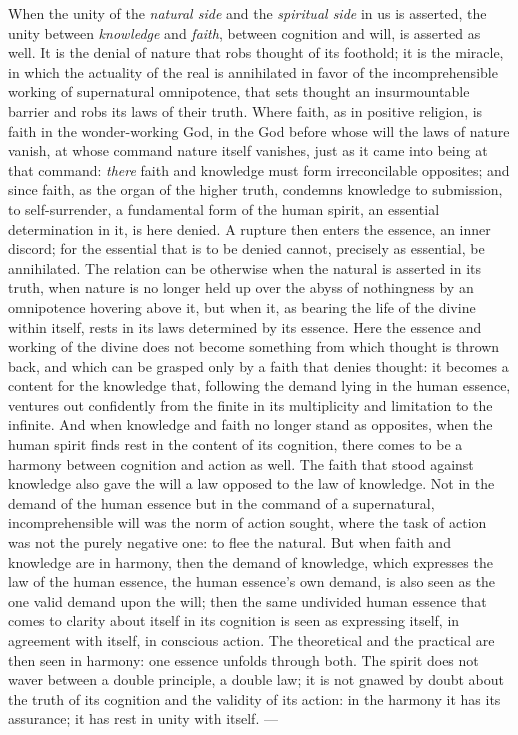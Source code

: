 \documentclass[12pt,a4paper,openany]{book}
\newcommand{\opage}[1]{\marginnote{\footnotesize\textit{[#1]}}}
\begin{document}
When the unity of the \emph{natural side} and the \emph{spiritual side}
in us is asserted, the unity between \emph{knowledge} and \emph{faith},
between cognition and will, is asserted as well. It is the denial
of nature that robs thought of its foothold; it is the miracle, in
which the actuality of the real is annihilated in favor of the
incomprehensible working of supernatural omnipotence, that sets
thought an insurmountable barrier and robs its laws of their truth.
Where faith, as in positive religion, is faith in the wonder-working
God, in the God before whose will the laws of nature vanish, at
whose command nature itself vanishes, just as it came into being at
that command: \emph{there} faith and knowledge must form irreconcilable
opposites; and since faith, as the organ of the higher truth,
condemns knowledge to submission, to self-surrender, a fundamental
form of the human spirit, an essential determination in it, is here
denied. A rupture then enters the essence, an inner discord; for the
essential that is to be denied cannot, precisely as essential, be
annihilated. The relation can be otherwise when the natural is
asserted in its truth, when nature is no longer held up over the
abyss of nothingness by an omnipotence hovering above it, but when it,
\opage{495}as bearing the life of the divine within itself, rests in its
laws determined by its essence. Here the essence and working of the
divine does not become something from which thought is thrown back,
and which can be grasped only by a faith that denies thought: it
becomes a content for the knowledge that, following the demand
lying in the human essence, ventures out confidently from the finite
in its multiplicity and limitation to the infinite. And when
knowledge and faith no longer stand as opposites, when the human
spirit finds rest in the content of its cognition, there comes to be
a harmony between cognition and action as well. The faith that stood
against knowledge also gave the will a law opposed to the law of
knowledge. Not in the demand of the human essence but in the command
of a supernatural, incomprehensible will was the norm of action
sought, where the task of action was not the purely negative one: to
flee the natural. But when faith and knowledge are in harmony, then
the demand of knowledge, which expresses the law of the human
essence, the human essence's own demand, is also seen as the one
valid demand upon the will; then the same undivided human essence
that comes to clarity about itself in its cognition is seen as
expressing itself, in agreement with itself, in conscious action.
The theoretical and the practical are then seen in harmony: one
essence unfolds through both. The spirit does not waver between a
double principle, a double law; it is not gnawed by doubt about the
truth of its cognition and the validity of its action: in the harmony
it has its assurance; it has rest in unity with itself. ---
\end{document}
